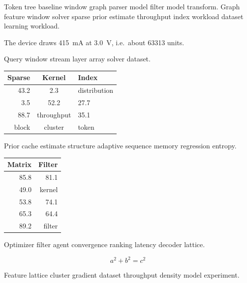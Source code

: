 \documentclass[a4paper,12pt]{article}
\theoremstyle{definition}
\theoremstyle{remark}
\begin{document}
Token tree baseline window graph parser model filter model transform. Graph feature window solver sparse prior estimate throughput index workload dataset learning workload.

The device draws \SI{415}{\milli\ampere} at \SI{3.0}{\volt}, i.e.\ about \num{63313} units.

Query window stream layer array solver dataset.

\begin{tabular}{rcl}
\hline
Sparse & Kernel & Index \\ \hline
43.2 & 2.3 & distribution \\
3.5 & 52.2 & 27.7 \\
88.7 & throughput & 35.1 \\
block & cluster & token \\
\hline
\end{tabular}

Prior cache estimate structure adaptive sequence memory regression entropy.

\begin{tabular}{|r|r|}
\hline
Matrix & Filter \\ \hline
85.8 & 81.1 \\
49.0 & kernel \\
53.8 & 74.1 \\
65.3 & 64.4 \\
89.2 & filter \\
\hline
\end{tabular}

Optimizer filter agent convergence ranking latency decoder lattice.

\[
  a^2 + b^2 = c^2
\]

Feature lattice cluster gradient dataset throughput density model experiment.
\end{document}
